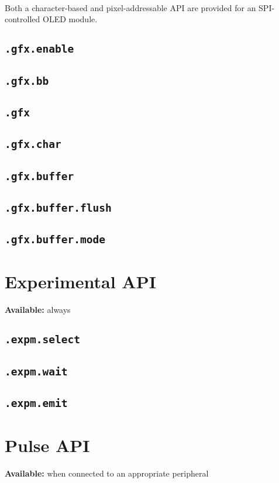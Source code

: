 \documentclass{article}
\begin{document}
~\\
Both a character-based and pixel-addressable API are provided for an SPI-controlled OLED module.

\subsection{\texttt{.gfx.enable}}
\subsection{\texttt{.gfx.bb}}
\subsection{\texttt{.gfx}}
\subsection{\texttt{.gfx.char}}
\subsection{\texttt{.gfx.buffer}}
\subsection{\texttt{.gfx.buffer.flush}}
\subsection{\texttt{.gfx.buffer.mode}}

\section{Experimental API}
\textbf{Available:} always

\subsection{\texttt{.expm.select}}
\subsection{\texttt{.expm.wait}}
\subsection{\texttt{.expm.emit}}

\section{Pulse API}
\textbf{Available:} when connected to an appropriate peripheral
\end{document}
